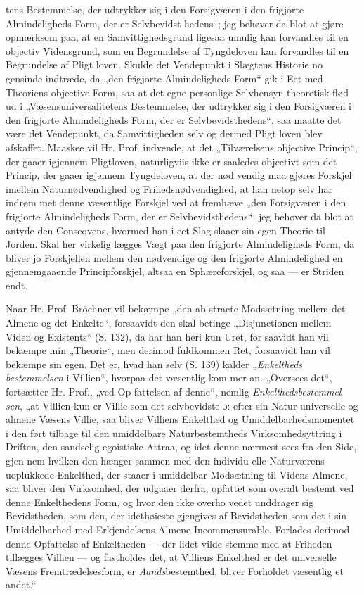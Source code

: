 \documentclass[12pt]{book}
\newcommand{\opage}[1]{\marginnote{\footnotesize\textit{[#1]}}}
\begin{document}
tens Bestemmelse, der udtrykker sig i den Forsigværen
i den frigjorte Almindeligheds Form, der er Selvbevidst\-%
hedens“; jeg behøver da blot at gjøre opmærksom paa,
at en Samvittighedsgrund ligesaa umulig kan forvandles
til en objectiv Vidensgrund, som en Begrundelse af
Tyngdeloven kan forvandles til en Begrundelse af Pligt\-%
loven. Skulde det Vendepunkt i Slægtens Historie no\-%
gensinde indtræde, da „den frigjorte Almindeligheds
Form“ gik i Eet med Theoriens objective Form, saa at
det egne personlige Selvhensyn theoretisk flød ud i
„Væsensuniversalitetens Bestemmelse, der udtrykker sig
i den Forsigværen i den frigjorte Almindeligheds Form,
der er Selvbevidsthedens“, saa maatte det være det
Vendepunkt, da Samvittigheden selv og dermed Pligt\-%
loven blev afskaffet. Maaskee vil Hr. Prof. indvende, at
det „Tilværelsens objective Princip“, der gaaer igjennem
Pligtloven, naturligviis ikke er saaledes objectivt som det
Princip, der gaaer igjennem Tyngdeloven, at der nød\-%
vendig maa gjøres Forskjel imellem Naturnødvendighed
og Frihedsnødvendighed, at han netop selv har indrøm\-%
\opage{31}\setcounter{footnote}{0}%
met denne væsentlige Forskjel ved at fremhæve „den
Forsigværen i den frigjorte Almindeligheds Form, der
er Selvbevidsthedens“; jeg behøver da blot at antyde
den Conseqvens, hvormed han i eet Slag slaaer sin egen
Theorie til Jorden. Skal her virkelig lægges Vægt paa
den frigjorte Almindeligheds Form, da bliver jo Forskjellen
mellem den nødvendige og den frigjorte Almindelighed en
gjennemgaaende Principforskjel, altsaa en Sphæreforskjel,
og saa --- er Striden endt.

Naar Hr. Prof. Bröchner vil bekæmpe „den ab\-%
stracte Modsætning mellem det Almene og det Enkelte“,
forsaavidt den skal betinge „Disjunctionen mellem Viden
og Existents“ (S. 132), da har han heri kun Uret, for\-%
saavidt han vil bekæmpe min „Theorie“, men derimod
fuldkommen Ret, forsaavidt han vil bekæmpe sin egen.
Det er, hvad han selv (S. 139) kalder „\emph{Enkeltheds\-%
bestemmelsen} i Villien“, hvorpaa det væsentlig kom\-%
mer an. „Oversees det“, fortsætter Hr. Prof., „ved Op\-%
fattelsen af denne“, nemlig \emph{Enkelthedsbestemmel\-%
sen}, „at Villien kun er Villie som det selvbevidste ɔ:
efter sin Natur universelle og almene Væsens Villie, saa
bliver Villiens Enkelthed og Umiddelbarhedsmomentet i
den ført tilbage til den umiddelbare Naturbestemtheds
Virksomhedsyttring i Driften, den sandselig egoistiske
Attraa, og idet denne nærmest sees fra den Side, gjen\-%
nem hvilken den hænger sammen med den individu\-%
elle Naturværens uoplukkede Enkelthed, der staaer i
umiddelbar Modsætning til Videns Almene, saa bliver den
Virksomhed, der udgaaer derfra, opfattet som overalt bestemt
ved denne Enkelthedens Form, og hvor den ikke overho\-%
vedet unddrager sig Bevidstheden, som den, der idethøieste
gjengives af Bevidstheden som det i sin Umiddelbarhed
med Erkjendelsens Almene Incommensurable. Forlades
derimod denne Opfattelse af Enkeltheden --- der lidet
\opage{32}\setcounter{footnote}{0}%
vilde stemme med at Friheden tillægges Villien --- og
fastholdes det, at Villiens Enkelthed er det universelle
Væsens Fremtrædelsesform, er \emph{Aands}bestemthed, bliver
Forholdet væsentlig et andet.“
\end{document}
